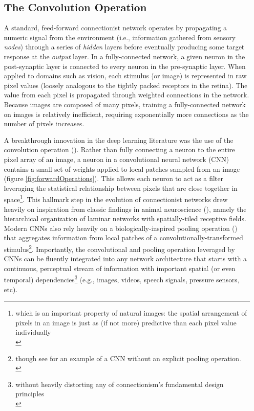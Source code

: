\documentclass[12pt]{article}
\let\oldcite=\cite
\renewcommand{\cite}[1]{\textcolor[rgb]{0, .121, .388}{\oldcite{#1}}}
\begin{document}
\subsection{The Convolution Operation}

A standard, feed-forward connectionist network operates by propagating a numeric signal from the environment (i.e., information gathered from sensory \emph{nodes}) through a series of \emph{hidden} layers before eventually producing some target response at the \emph{output} layer. In a fully-connected network, a given neuron in the post-synaptic layer is connected to every neuron in the pre-synaptic layer. When applied to domains such as vision, each stimulus (or image) is represented in raw pixel values (loosely analogous to the tightly packed receptors in the retina). The value from each pixel is propagated through weighted connections in the network. Because images are composed of many pixels, training a fully-connected network on images is relatively inefficient, requiring exponentially more connections as the number of pixels increases. 

A breakthrough innovation in the deep learning literature was the use of the convolution operation (\cite{fukushima1983neocognitron,lecun1989backpropagation}). Rather than fully connecting a neuron to the entire pixel array of an image, a neuron in a convolutional neural network (CNN) contains a small set of weights applied to local patches sampled from an image (figure \ref{fig:forwardOperations}). This allows each neuron to act as a filter leveraging the statistical relationship between pixels that are close together in space\footnote{which is an important property of natural images: the spatial arrangement of pixels in an image is just as (if not more) predictive than each pixel value individually \\}. This hallmark step in the evolution of connectionist networks drew heavily on inspiration from classic findings in animal neuroscience (\cite{hubel1968receptive}), namely the hierarchical organization of laminar networks with spatially-tiled receptive fields. Modern CNNs also rely heavily on a biologically-inspired pooling operation (\cite{lecun2015deep}) that aggregates information from local patches of a convolutionally-transformed stimulus\footnote{though see \cite{springenberg2014striving} for an example of a CNN without an explicit pooling operation. \\}. Importantly, the convolutional and pooling operation leveraged by CNNs can be fluently integrated into any network architecture that starts with a continuous, perceptual stream of information with important spatial (or even temporal) dependencies\footnote{without heavily distorting any of connectionism's fundamental design principles \\} (e.g., images, videos, speech signals, pressure sensors, etc). 
\end{document}
